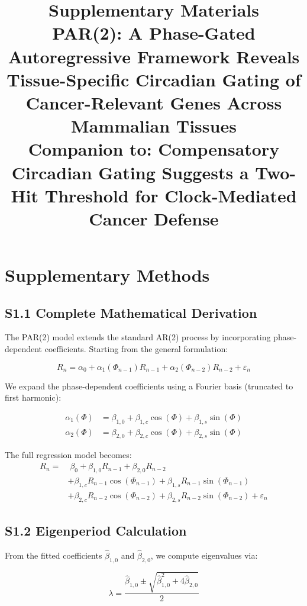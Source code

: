 \documentclass[11pt,a4paper]{article}
\title{\textbf{Supplementary Materials}\\[0.5em]
\large PAR(2): A Phase-Gated Autoregressive Framework Reveals Tissue-Specific Circadian Gating of Cancer-Relevant Genes Across Mammalian Tissues\\[0.3em]
\normalsize Companion to: Compensatory Circadian Gating Suggests a Two-Hit Threshold for Clock-Mediated Cancer Defense}
\author{}
\date{}
\begin{document}
\maketitle

\tableofcontents
\newpage

\section{Supplementary Methods}

\subsection{S1.1 Complete Mathematical Derivation}

The PAR(2) model extends the standard AR(2) process by incorporating phase-dependent coefficients. Starting from the general formulation:

\begin{equation}
R_n = \alpha_0 + \alpha_1(\Phi_{n-1})R_{n-1} + \alpha_2(\Phi_{n-2})R_{n-2} + \varepsilon_n
\end{equation}

We expand the phase-dependent coefficients using a Fourier basis (truncated to first harmonic):

\begin{align}
\alpha_1(\Phi) &= \beta_{1,0} + \beta_{1,c}\cos(\Phi) + \beta_{1,s}\sin(\Phi) \\
\alpha_2(\Phi) &= \beta_{2,0} + \beta_{2,c}\cos(\Phi) + \beta_{2,s}\sin(\Phi)
\end{align}

The full regression model becomes:
\begin{align}
R_n = &\; \beta_0 + \beta_{1,0}R_{n-1} + \beta_{2,0}R_{n-2} \nonumber \\
      &+ \beta_{1,c}R_{n-1}\cos(\Phi_{n-1}) + \beta_{1,s}R_{n-1}\sin(\Phi_{n-1}) \nonumber \\
      &+ \beta_{2,c}R_{n-2}\cos(\Phi_{n-2}) + \beta_{2,s}R_{n-2}\sin(\Phi_{n-2}) + \varepsilon_n
\end{align}

\subsection{S1.2 Eigenperiod Calculation}

From the fitted coefficients $\hat{\beta}_{1,0}$ and $\hat{\beta}_{2,0}$, we compute eigenvalues via:

\begin{equation}
\lambda = \frac{\hat{\beta}_{1,0} \pm \sqrt{\hat{\beta}_{1,0}^2 + 4\hat{\beta}_{2,0}}}{2}
\end{equation}
\end{document}
